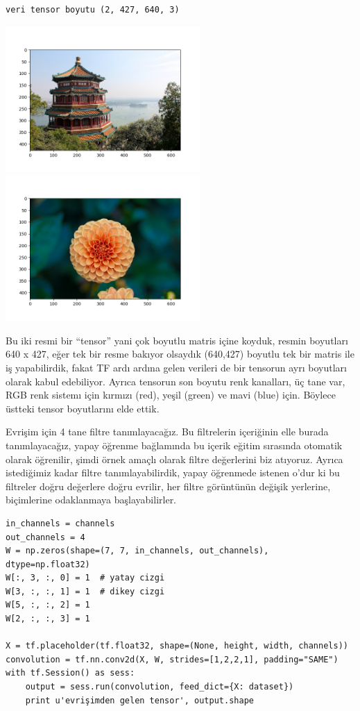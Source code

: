 \documentclass[12pt,fleqn]{article}\usepackage{../../common}
\begin{document}
\begin{verbatim}
veri tensor boyutu (2, 427, 640, 3)
\end{verbatim}

\includegraphics[width=20em]{conv-9.png}
\includegraphics[width=20em]{conv-10.png}

Bu iki resmi bir ``tensor'' yani çok boyutlu matris içine koyduk, resmin
boyutları 640 x 427, eğer tek bir resme bakıyor olsaydık (640,427) boyutlu
tek bir matris ile iş yapabilirdik, fakat TF ardı ardına gelen verileri de
bir tensorun ayrı boyutları olarak kabul edebiliyor. Ayrıca tensorun son
boyutu renk kanalları, üç tane var, RGB renk sistemı için kırmızı (red),
yeşil (green) ve mavi (blue) için. Böylece üstteki tensor boyutlarını elde
ettik.

Evrişim için 4 tane filtre tanımlayacağız. Bu filtrelerin içeriğinin elle
burada tanımlayacağız, yapay öğrenme bağlamında bu içerik eğitim sırasında
otomatik olarak öğrenilir, şimdi örnek amaçlı olarak filtre değerlerini biz
atıyoruz. Ayrıca istediğimiz kadar filtre tanımlayabilirdik, yapay
öğrenmede istenen o'dur ki bu filtreler doğru değerlere doğru evrilir, her
filtre görüntünün değişik yerlerine, biçimlerine odaklanmaya
başlayabilirler. 

\begin{verbatim}
in_channels = channels
out_channels = 4
W = np.zeros(shape=(7, 7, in_channels, out_channels), dtype=np.float32)
W[:, 3, :, 0] = 1  # yatay cizgi
W[3, :, :, 1] = 1  # dikey cizgi
W[5, :, :, 2] = 1  
W[2, :, :, 3] = 1  

X = tf.placeholder(tf.float32, shape=(None, height, width, channels))
convolution = tf.nn.conv2d(X, W, strides=[1,2,2,1], padding="SAME")
with tf.Session() as sess:
    output = sess.run(convolution, feed_dict={X: dataset})
    print u'evrişimden gelen tensor', output.shape
\end{verbatim}
\end{document}
